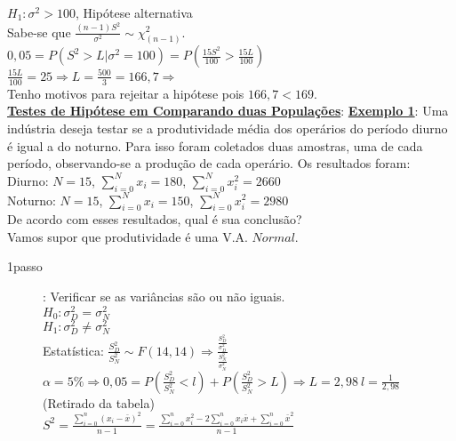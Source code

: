 \documentclass[12pt, oneside]{article}
\newcommand{\mytitle}[1]{\textbf{\underline{#1}}}
\newcommand{\gsum}[3]{\displaystyle\sum_{#1}^#2 #3}
\begin{document}
$H_1: \sigma^2>100$, Hipótese alternativa\\
Sabe-se que $\frac{(n-1)S^2}{\sigma^2}\sim \chi_{(n-1)}^2$.\\
$0,05=P(S^2>L|\sigma^2=100)=P(\frac{15S^2}{100}>\frac{15L}{100})$\\
$\frac{15L}{100}=25\Rightarrow L=\frac{500}{3}=166,7\Rightarrow$\\
Tenho motivos para rejeitar a hipótese pois $166,7<169$.\\
\mytitle{Testes de Hipótese em Comparando duas Populações}:
\mytitle{Exemplo 1}: Uma indústria deseja testar se a produtividade média dos operários do período diurno é igual a do noturno. Para isso foram coletados duas amostras, uma de cada período, observando-se a produção de cada operário. Os resultados foram:\\
Diurno: $N=15$, $\gsum{i=0}{N}{x_i}=180$, $\gsum{i=0}{N}{x_i^2}=2660$\\
Noturno: $N=15$, $\gsum{i=0}{N}{x_i}=150$, $\gsum{i=0}{N}{x_i^2}=2980$\\
De acordo com esses resultados, qual é sua conclusão?\\
Vamos supor que produtividade é uma V.A. $Normal$.\\
\begin{description}
\item[1\textordmasculine passo]: Verificar se as variâncias são ou não iguais.\\
  $H_0: \sigma_D^2=\sigma_N^2$\\
  $H_1: \sigma_D^2\neq\sigma_N^2$\\
  Estatística: $\frac{S_D^2}{S_N^2}\sim F(14,14)\Rightarrow\frac{\frac{S_D^2}{\sigma_D^2}}{\frac{S_N^2}{\sigma_N^2}}$\\
  $\alpha=5\%\Rightarrow 0,05=P(\frac{S_D^2}{S_N^2}<l)+P(\frac{S_D^2}{S_N^2}>L)\Rightarrow L=2,98 \: l=\frac{1}{2,98}$ (Retirado da tabela)\\
  $S^2=\frac{\gsum{i=0}{n}{(x_i-\bar{x})^2}}{n-1} =\frac{\gsum{i=0}{n}{x_i^2}-2\gsum{i=0}{n}{x_i\bar{x}+\gsum{i=0}{n}{\bar{x}^2}}}{n-1}$
\end{description}
\end{document}
